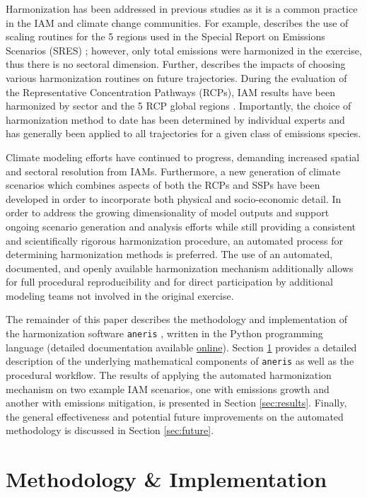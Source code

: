 \documentclass[review]{elsarticle}
\newcommand{\code}[1]{\lstinline[basicstyle=\ttfamily\color{black}]|#1|}
\begin{document}
Harmonization has been addressed in previous studies as it is a common practice
in the IAM and climate change communities. For example,
\cite{meinshausen_rcp_2011} describes the use of scaling routines for the 5
regions used in the Special Report on Emissions Scenarios (SRES)
\cite{nakicenovic2000}; however, only total emissions were harmonized in the
exercise, thus there is no sectoral dimension. Further,
\cite{rogelj_discrepancies_2011} describes the impacts of choosing various
harmonization routines on future trajectories. During the evaluation of the
Representative Concentration Pathways (RCPs), IAM results have been harmonized
by sector and the 5 RCP global regions
\cite{vuuren_representative_2011}. Importantly, the choice of harmonization
method to date has been determined by individual experts and has generally been
applied to all trajectories for a given class of emissions species.

Climate modeling efforts have continued to progress, demanding increased spatial
and sectoral resolution from IAMs. Furthermore, a new generation of climate
scenarios which combines aspects of both the RCPs and SSPs have been developed
in order to incorporate both physical and socio-economic detail. In order to
address the growing dimensionality of model outputs and support ongoing scenario
generation and analysis efforts while still providing a consistent and
scientifically rigorous harmonization procedure, an automated process for
determining harmonization methods is preferred. The use of an automated,
documented, and openly available harmonization mechanism additionally allows for
full procedural reproducibility and for direct participation by additional
modeling teams not involved in the original exercise.

The remainder of this paper describes the methodology and implementation of the
harmonization software \code{aneris} \cite{matthew_gidden_2017_802832}, written
in the Python programming language (detailed documentation available
\href{http://mattgidden.com/aneris/}{online}). Section \ref{sec:meths} provides
a detailed description of the underlying mathematical components of
\code{aneris} as well as the procedural workflow. The results of applying the
automated harmonization mechanism on two example IAM scenarios, one with
emissions growth and another with emissions mitigation, is presented in Section
\ref{sec:results}. Finally, the general effectiveness and potential future
improvements on the automated methodology is discussed in Section
\ref{sec:future}.
\section{Methodology \& Implementation}\label{sec:meths}
\end{document}
